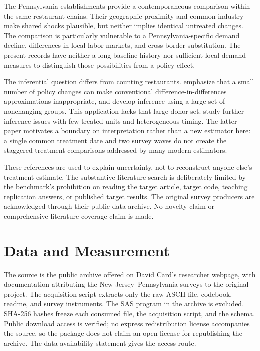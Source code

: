 \documentclass[11pt]{article}
\begin{document}
The Pennsylvania establishments provide a contemporaneous comparison within the same restaurant chains. Their geographic proximity and common industry make shared shocks plausible, but neither implies identical untreated changes. The comparison is particularly vulnerable to a Pennsylvania-specific demand decline, differences in local labor markets, and cross-border substitution. The present records have neither a long baseline history nor sufficient local demand measures to distinguish those possibilities from a policy effect. %

The inferential question differs from counting restaurants. \citet{conley2005} emphasize that a small number of policy changes can make conventional difference-in-differences approximations inappropriate, and develop inference using a large set of nonchanging groups. This application lacks that large donor set. \citet{alvarez2023} study further inference issues with few treated units and heterogeneous timing. The latter paper motivates a boundary on interpretation rather than a new estimator here: a single common treatment date and two survey waves do not create the staggered-treatment comparisons addressed by many modern estimators. %

These references are used to explain uncertainty, not to reconstruct anyone else's treatment estimate. The substantive literature search is deliberately limited by the benchmark's prohibition on reading the target article, target code, teaching replication answers, or published target results. The original survey producers are acknowledged through their public data archive. No novelty claim or comprehensive literature-coverage claim is made. %

\section{Data and Measurement}
The source is the public archive offered on David Card's researcher webpage, with documentation attributing the New Jersey--Pennsylvania surveys to the original project. The acquisition script extracts only the raw ASCII file, codebook, readme, and survey instruments. The SAS program in the archive is excluded. SHA-256 hashes freeze each consumed file, the acquisition script, and the schema. Public download access is verified; no express redistribution license accompanies the source, so the package does not claim an open license for republishing the archive. The data-availability statement gives the access route. %
\end{document}
